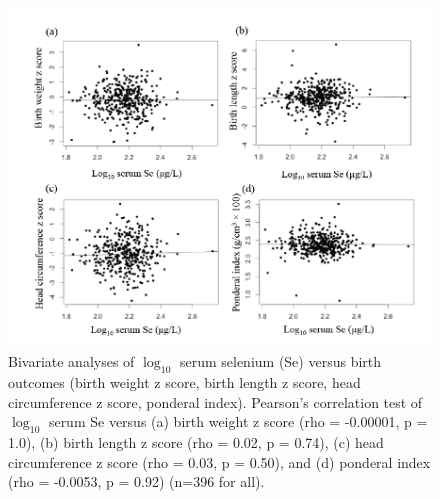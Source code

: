 \begin{figure}
  \centering
    \label{fig:Fig335}
  \includegraphics[scale=1]{Figures/Fig335.pdf}
  \caption[Bivariate analyses of $\log_{10}$ serum selenium versus birth outcomes (birth weight z score, birth length z score, head circumference z score, ponderal index)]{Bivariate analyses of $\log_{10}$ serum selenium (Se) versus birth outcomes (birth weight z score, birth length z score, head circumference z score, ponderal index). Pearson's correlation test of $\log_{10}$ serum Se versus (a) birth weight z score (rho = -0.00001, p = 1.0), (b) birth length z score (rho = 0.02, p = 0.74), (c) head circumference z score (rho = 0.03, p = 0.50), and (d) ponderal index (rho = -0.0053, p = 0.92) (n=396 for all).}
\end{figure}


